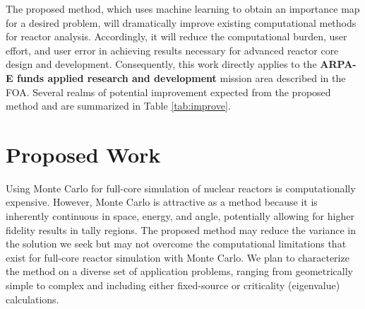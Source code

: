 \documentclass[letterpaper,12pt]{article}
\begin{document}
The proposed method, which uses machine learning to obtain an
importance map for a desired problem, will dramatically improve existing 
computational methods for reactor analysis.  Accordingly, it will
reduce the computational burden, user effort, and user error in 
achieving results necessary for advanced reactor core design and development.
Consequently, this work
directly applies to the \textbf{ARPA-E funds applied research and development}
mission area described in the FOA. Several realms of potential improvement 
expected from the proposed method and are summarized in Table \ref{tab:improve}.



\section{Proposed Work}

Using Monte Carlo for full-core simulation of nuclear reactors is
computationally expensive\cite{martin_challenges_2012}. However, Monte Carlo is
attractive as a method because it is inherently continuous in space, energy, and
angle, potentially allowing for higher fidelity results in tally regions.
The proposed method may reduce
the variance in the solution we seek but may not overcome the computational
limitations that exist for full-core reactor simulation with Monte Carlo. We plan to
characterize the method on a diverse set of application problems, ranging from
geometrically simple to complex and including either fixed-source or criticality
(eigenvalue) calculations.
\end{document}

